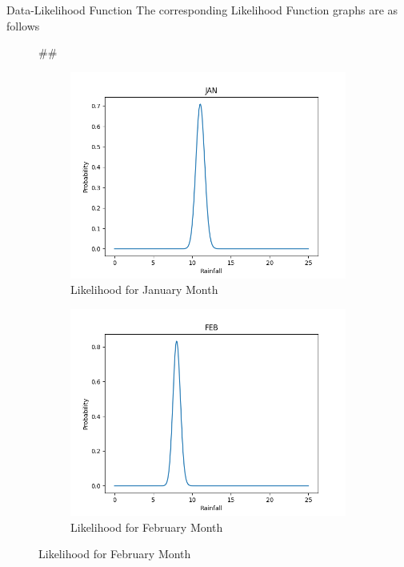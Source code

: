 \documentclass{beamer}
\newenvironment{subcolumns}[1]
 {\valign\bgroup\hsize=#1##\cr}
 {\crcr\egroup}
\newcommand{\nextsubcolumn} {\cr\noalign{\hfill}}
\begin{document}
\begin{frame}{Data-Likelihood Function}
The corresponding Likelihood Function graphs are as follows
\begin{figure}[htp]
\centering
\begin{subcolumns}{0.50\columnwidth}
\begin{subfigure}{0.50\columnwidth}
\centering
\includegraphics[width=\textwidth]{Images/LikeJAN.png}
\caption{Likelihood for January Month}
\end{subfigure}
\nextsubcolumn
\begin{subfigure}{0.5\columnwidth}
\centering
\includegraphics[width=\textwidth]{Images/LikeFEB.png}
\caption{Likelihood for February Month}
\end{subfigure}
\end{subcolumns}
\end{figure}
\end{frame}
\end{document}
